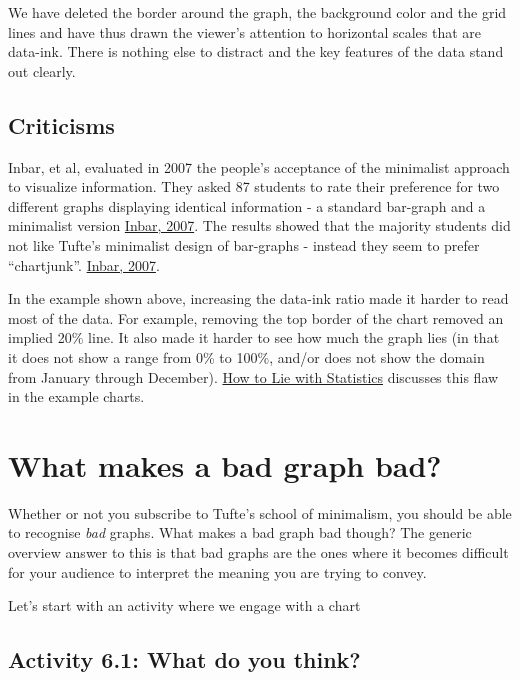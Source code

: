 \documentclass[
]{book}
\begin{document}
We have deleted the border around the graph, the background color and the grid lines and have thus drawn the viewer's attention to horizontal scales that are data-ink. There is nothing else to distract and the key features of the data stand out clearly.

\hypertarget{criticisms}{%
\subsection{Criticisms}\label{criticisms}}

Inbar, et al, evaluated in 2007 the people's acceptance of the minimalist approach to visualize information. They asked 87 students to rate their preference for two different graphs displaying identical information - a standard bar-graph and a minimalist version \href{http://portal.acm.org/citation.cfm?id=1362587}{Inbar, 2007}. The results showed that the majority students did not like Tufte's minimalist design of bar-graphs - instead they seem to prefer ``chartjunk''. \href{http://portal.acm.org/citation.cfm?id=1362587}{Inbar, 2007}.

In the example shown above, increasing the data-ink ratio made it harder to read most of the data. For example, removing the top border of the chart removed an implied 20\% line. It also made it harder to see how much the graph lies (in that it does not show a range from 0\% to 100\%, and/or does not show the domain from January through December). \href{https://www.librarysearch.manchester.ac.uk/primo-explore/fulldisplay?docid=44MAN_ALMA_DS21134626320001631\&context=L\&vid=MU_NUI\&search_scope=BLENDED\&isFrbr=true\&tab=local\&lang=en_US}{How to Lie with Statistics} discusses this flaw in the example charts.

\hypertarget{what-makes-a-bad-graph-bad}{%
\section{What makes a bad graph bad?}\label{what-makes-a-bad-graph-bad}}

Whether or not you subscribe to Tufte's school of minimalism, you should be able to recognise \emph{bad} graphs. What makes a bad graph bad though? The generic overview answer to this is that bad graphs are the ones where it becomes difficult for your audience to interpret the meaning you are trying to convey.

Let's start with an activity where we engage with a chart

\hypertarget{activity-6.1-what-do-you-think}{%
\subsection{Activity 6.1: What do you think?}\label{activity-6.1-what-do-you-think}}
\end{document}

